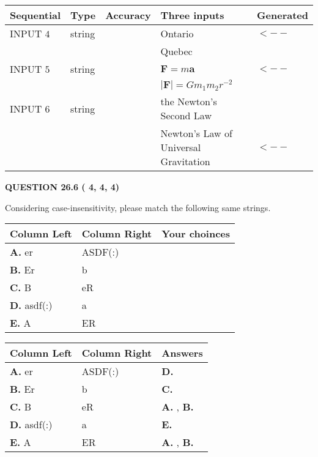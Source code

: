 \documentclass[12pt]{article}
\begin{document}
   
  
  
\noindent\begin{tabular}{|l|l|l|l|l|}
\hline
 Sequential & Type & Accuracy & Three inputs & Generated \\ 
\hline
 
 
  INPUT $           4$ & string & & 
 Ontario & 
  $ <-- $ 
  \\
  & & & 
 Quebec & 
 \\  \hline  
 
 
  INPUT $           5$ & string & & 
 $\mathbf{F}=m\mathbf{a}$ & 
  $ <-- $ 
  \\
  & & & 
 $\left| \mathbf{F}\right| =Gm_1m_2r^{-2}$ & 
 \\  \hline  
 
 
  INPUT $           6$ & string & & 
 the Newton's Second Law & 
  \\
  & & & 
 Newton's Law of Universal Gravitation & 
  $ <-- $ 
 \\  \hline  
 \end{tabular}
   
   
  
\vspace{0.2in}
  
{\textbf{\Large{QUESTION
26.6 
 (          4,          4,          4)
}}}
  
  
Considering case-insensitivity, please match the following same strings.
  
  
\begin{tabular}{|l|l|l|}
 \hline
 Column Left & Column Right  & Your choinces \\ 
 \hline
{\textbf{\large{
A.}}}
er
  & 
ASDF(:)
 & 
 \\ 
 \hline
{\textbf{\large{
B.}}}
Er
  & 
b
 & 
 \\ 
 \hline
{\textbf{\large{
C.}}}
B
  & 
eR
 & 
 \\ 
 \hline
{\textbf{\large{
D.}}}
asdf(:)
  & 
a
 & 
 \\ 
 \hline
{\textbf{\large{
E.}}}
A
  & 
ER
 & 
 \\ 
 \hline
 \end{tabular}
  
  
 
 
\noindent{}
  
  
\begin{tabular}{|l|l|l|}
 \hline
 Column Left & Column Right  & Answers       \\ 
 \hline
{\textbf{\large{
A.}}}
er
  & 
ASDF(:)
 & 
{\textbf{\large{
D.}}}
 \\ 
 \hline
{\textbf{\large{
B.}}}
Er
  & 
b
 & 
{\textbf{\large{
C.}}}
 \\ 
 \hline
{\textbf{\large{
C.}}}
B
  & 
eR
 & 
{\textbf{\large{
A.}}}
, 
{\textbf{\large{
B.}}}
 \\ 
 \hline
{\textbf{\large{
D.}}}
asdf(:)
  & 
a
 & 
{\textbf{\large{
E.}}}
 \\ 
 \hline
{\textbf{\large{
E.}}}
A
  & 
ER
 & 
{\textbf{\large{
A.}}}
, 
{\textbf{\large{
B.}}}
 \\ 
 \hline
 \end{tabular}
  
\end{document}
